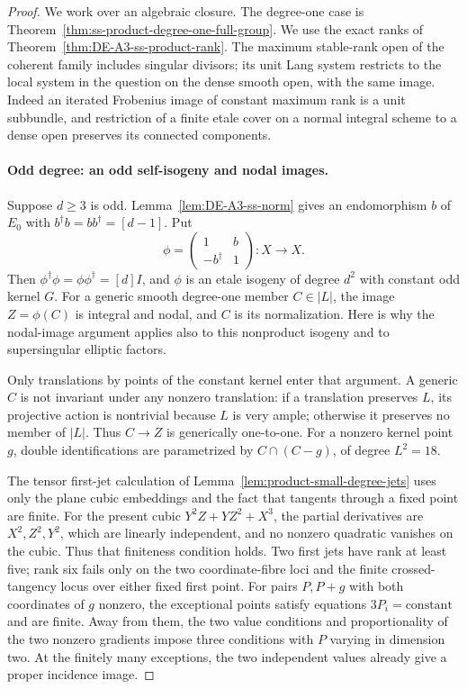 \begin{proof}
We work over an algebraic closure. The degree-one case is
Theorem~\ref{thm:ss-product-degree-one-full-group}.
We use the exact ranks of Theorem~\ref{thm:DE-A3-ss-product-rank}.
The maximum stable-rank open of the coherent family includes singular
divisors; its unit Lang system restricts to the local system in the
question on the dense smooth open, with the same image.
Indeed an iterated Frobenius image of constant maximum rank is a
unit subbundle, and restriction of a finite etale cover on a normal
integral scheme to a dense open preserves its connected components.

\paragraph{Odd degree: an odd self-isogeny and nodal images.}
Suppose $d\ge3$ is odd. Lemma~\ref{lem:DE-A3-ss-norm} gives an
endomorphism $b$ of $E_0$ with $b^\dagger b=bb^\dagger=[d-1]$.
Put
\[
 \phi=\begin{pmatrix}1&b\\-b^\dagger&1\end{pmatrix}:X\longrightarrow X.
\]
Then $\phi^\dagger\phi=\phi\phi^\dagger=[d]I$, and $\phi$ is
an etale isogeny of degree $d^2$ with constant odd kernel $G$.
For a generic smooth degree-one member $C\in|L|$, the image
$Z=\phi(C)$ is integral and nodal, and $C$ is its normalization.
Here is why the nodal-image argument applies also to this nonproduct
isogeny and to supersingular elliptic factors.

Only translations by points of the constant kernel enter that argument.
A generic $C$ is not invariant under any nonzero translation: if a
translation preserves $L$, its projective action is nontrivial because
$L$ is very ample; otherwise it preserves no member of $|L|$.
Thus $C\to Z$ is generically one-to-one. For a nonzero kernel point
$g$, double identifications are parametrized by
$C\cap(C-g)$, of degree $L^2=18$.

The tensor first-jet calculation of
Lemma~\ref{lem:product-small-degree-jets} uses only the plane cubic
embeddings and the fact that tangents through a fixed point are finite.
For the present cubic $Y^2Z+YZ^2+X^3$, the partial derivatives are
$X^2,Z^2,Y^2$, which are linearly independent, and no nonzero quadratic
vanishes on the cubic. Thus that finiteness condition holds.
Two first jets have rank at least five; rank six fails only on the
two coordinate-fibre loci and the finite crossed-tangency locus
over either fixed first point. For pairs $P,P+g$ with both coordinates
of $g$ nonzero, the exceptional points satisfy equations
$3P_i=\text{constant}$ and are finite. Away from them, the two value
conditions and proportionality of the two nonzero gradients impose
three conditions with $P$ varying in dimension two.
At the finitely many exceptions, the two independent values already
give a proper incidence image.


\end{proof}
